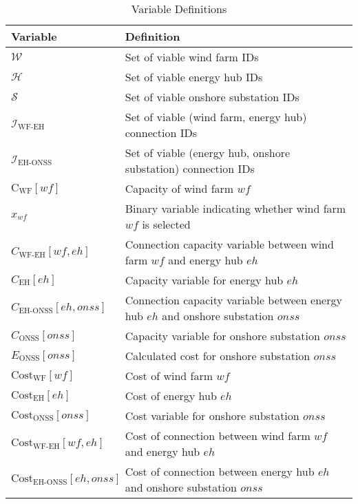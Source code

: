 \begin{table}[h!]
\centering
\begin{tabular}{|>{\centering\arraybackslash}m{3cm}|>{\centering\arraybackslash}m{10cm}|}
\hline
\textbf{Variable} & \textbf{Definition} \\
\hline
\( \mathcal{W} \) & Set of viable wind farm IDs \\
\hline
\( \mathcal{H} \) & Set of viable energy hub IDs \\
\hline
\( \mathcal{S} \) & Set of viable onshore substation IDs \\
\hline
\( \mathcal{I}_{\text{WF-EH}} \) & Set of viable (wind farm, energy hub) connection IDs \\
\hline
\( \mathcal{I}_{\text{EH-ONSS}} \) & Set of viable (energy hub, onshore substation) connection IDs \\
\hline
\( \text{C}_{\text{WF}}[wf] \) & Capacity of wind farm \( wf \) \\
\hline
\( x_{wf} \) & Binary variable indicating whether wind farm \( wf \) is selected \\
\hline
\( C_{\text{WF-EH}}[wf, eh] \) & Connection capacity variable between wind farm \( wf \) and energy hub \( eh \) \\
\hline
\( C_{\text{EH}}[eh] \) & Capacity variable for energy hub \( eh \) \\
\hline
\( C_{\text{EH-ONSS}}[eh, onss] \) & Connection capacity variable between energy hub \( eh \) and onshore substation \( onss \) \\
\hline
\( C_{\text{ONSS}}[onss] \) & Capacity variable for onshore substation \( onss \) \\
\hline
\( E_{\text{ONSS}}[onss] \) & Calculated cost for onshore substation \( onss \) \\
\hline
\( \text{Cost}_{\text{WF}}[wf] \) & Cost of wind farm \( wf \) \\
\hline
\( \text{Cost}_{\text{EH}}[eh] \) & Cost of energy hub \( eh \) \\
\hline
\( \text{Cost}_{\text{ONSS}}[onss] \) & Cost variable for onshore substation \( onss \) \\
\hline
\( \text{Cost}_{\text{WF-EH}}[wf, eh] \) & Cost of connection between wind farm \( wf \) and energy hub \( eh \) \\
\hline
\( \text{Cost}_{\text{EH-ONSS}}[eh, onss] \) & Cost of connection between energy hub \( eh \) and onshore substation \( onss \) \\
\hline
\end{tabular}
\caption{Variable Definitions}
\label{tab:variable_definitions}
\end{table}
